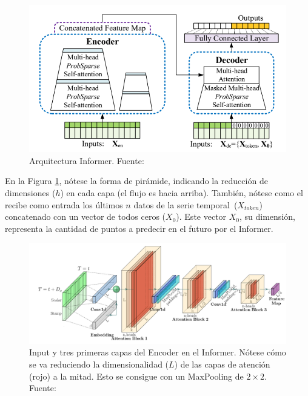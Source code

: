 {\begin{figure}[H]
    \centering
    \includegraphics[scale = 0.55]{imgs/informer_distill.png}
    \caption{Arquitectura Informer.  \scriptsize{Fuente: \parencite{informer}}}
    \label{distill}
\end{figure}

En la Figura \ref{distill}, nótese la forma de pirámide, indicando la reducción de dimensiones ($h$) en cada capa (el flujo es hacia arriba). También, nótese como el  recibe como entrada los últimos $n$ datos de la serie temporal\protect\fnm\ ($X_{token}$) concatenado con un vector de todos ceros ($X_0$). Este vector $X_0$, su dimensión, representa la cantidad de puntos a predecir en el futuro por el Informer.

\begin{figure}[H]
    \centering
    \includegraphics[scale = 0.5]{imgs/informer_maxPooling.png}
    \caption{Input y tres primeras capas del Encoder en el Informer. Nótese cómo se va reduciendo la dimensionalidad ($L$) de las capas de atención (rojo) a la mitad. Esto se consigue con un MaxPooling de $2\times2$. \scriptsize{Fuente: \parencite{informer}}}
    \label{maxPooling}
\end{figure}

}

